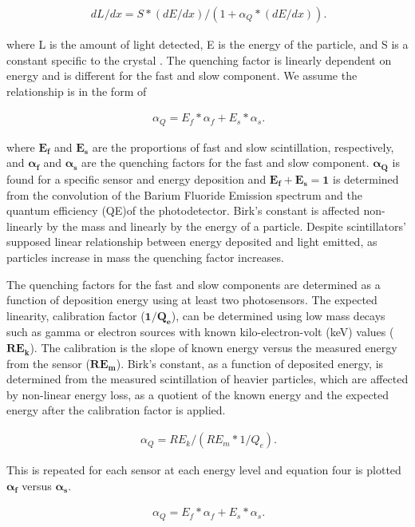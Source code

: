 \documentclass[aip, jmp, amssymb, amsmath, reprint, floatfix]{revtex4-1}
\begin{document}
\begin{eqnarray}
\ dL/dx = S * (dE/dx)/(1 + \alpha_Q * (dE/dx))
\label{eq:one}.
\end{eqnarray}


where L is the amount of light detected, E is the energy of the particle, and S is a constant specific to the crystal \cite{BaF2scint}. The quenching factor is linearly dependent on energy and is different for the fast and slow component. We assume the relationship is in the form of 

\begin{eqnarray}
\ \alpha_Q = E_f * \alpha_f + E_s * \alpha_s
\label{eq:two}.
\end{eqnarray}

where $\bm{E_f}$ and $\bm{E_s}$ are the proportions of fast and slow scintillation, respectively, and $\bm{\alpha_f}$ and $\bm{\alpha_s}$ are the quenching factors for the fast and slow component. $\bm{\alpha_Q}$ is found for a specific sensor and energy deposition and $\bm{E_f + E_s = 1}$ is determined from the convolution of the Barium Fluoride Emission spectrum and the quantum efficiency (QE)of the photodetector. Birk's constant is affected non-linearly by the mass and linearly by the energy of a particle. Despite scintillators' supposed linear relationship between energy deposited and light emitted, as particles increase in mass the quenching factor increases. 

The quenching factors for the fast and slow components are determined as a function of deposition energy using at least two photosensors. The expected linearity, calibration factor ($\bm{1/Q_e}$), can be determined using low mass decays such as gamma or electron sources with known kilo-electron-volt (keV) values ($\bm{RE_k}$). The calibration is the slope of known energy versus the measured energy from the sensor ($\bm{RE_m}$). Birk's constant, as a function of deposited energy, is determined from the measured scintillation of heavier particles, which are affected by non-linear energy loss, as a quotient of the known energy and the expected energy after the calibration factor is applied. 

\begin{eqnarray}
\ \alpha_Q = RE_k / (RE_m * 1/Q_e)
\label{eq:three}.
\end{eqnarray}

This is repeated for each sensor at each energy level and equation four is plotted $\bm{\alpha_f}$ versus $\bm{\alpha_s}$.  

\begin{eqnarray}
\ \alpha_Q = E_f * \alpha_f + E_s * \alpha_s
\label{eq:four}.
\end{eqnarray}
\end{document}
